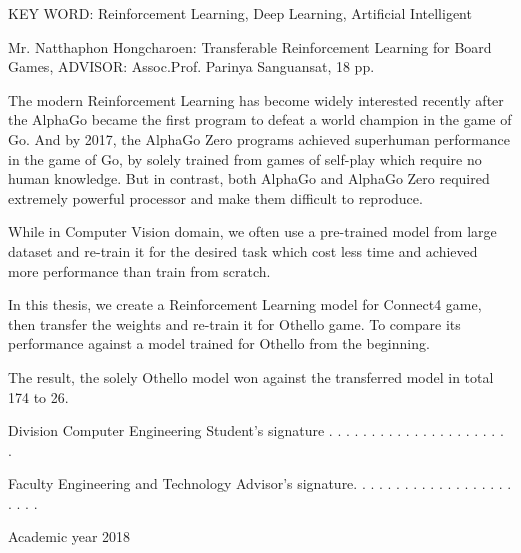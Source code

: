\documentclass[12pt,a4paper]{report}
\begin{document}
\makeatother


\pagestyle{fancy}
\fancyhf{}
\renewcommand{\headrulewidth}{0pt}
\rhead{\thepage}
\setcounter{page}{1}
\setcounter{secnumdepth}{0}
\begin{flushleft} KEY WORD: Reinforcement Learning, Deep Learning, Artificial Intelligent\par\end{flushleft}
Mr. Natthaphon Hongcharoen: Transferable Reinforcement Learning for Board Games, ADVISOR: Assoc.Prof. Parinya Sanguansat, 18 pp.\par
The modern Reinforcement Learning has become widely interested recently after the AlphaGo became the first program to defeat a world champion in the game of Go. And by 2017, the AlphaGo Zero programs achieved superhuman performance in the game of Go, by solely trained from games of self-play which require no human knowledge. But in contrast, both AlphaGo and AlphaGo Zero required extremely powerful processor and make them difficult to reproduce.\par
While in Computer Vision domain, we often use a pre-trained model from large dataset and re-train it for the desired task which cost less time and achieved more performance than train from scratch.\par
In this thesis, we create a Reinforcement Learning model for Connect4 game, then transfer the weights and re-train it for Othello game. To compare its performance against a model trained for Othello from the beginning.\par
The result, the solely Othello model won against the transferred model in total 174 to 26.\par
\vfill
\begin{flushleft}
Division Computer Engineering         \hfill Student's signature . . . . . . . . . . . . . . . . . . . . . .\par
Faculty Engineering and Technology \hfill Advisor's signature. . . . . . . . . . . . . . . . . . . . . . .\par
Academic year 2018\par
\end{flushleft}
\clearpage
\setcounter{secnumdepth}{0}
\end{document}
